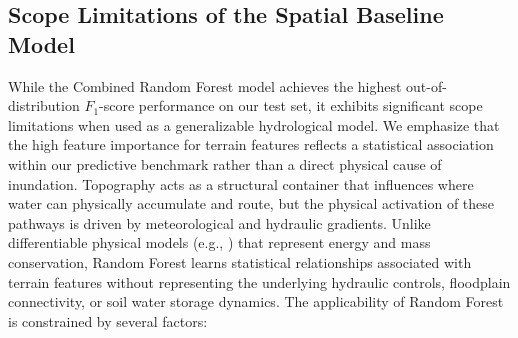 \documentclass[12pt, a4paper]{article}
\begin{document}
\subsection{Scope Limitations of the Spatial Baseline Model}
While the Combined Random Forest model achieves the highest out-of-distribution $F_1$-score performance on our test set, it exhibits significant scope limitations when used as a generalizable hydrological model. We emphasize that the high feature importance for terrain features reflects a statistical association within our predictive benchmark rather than a direct physical cause of inundation. Topography acts as a structural container that influences where water can physically accumulate and route, but the physical activation of these pathways is driven by meteorological and hydraulic gradients. Unlike differentiable physical models (e.g., \citealp{Feng2023The}) that represent energy and mass conservation, Random Forest learns statistical relationships associated with terrain features without representing the underlying hydraulic controls, floodplain connectivity, or soil water storage dynamics. The applicability of Random Forest is constrained by several factors:
\end{document}
